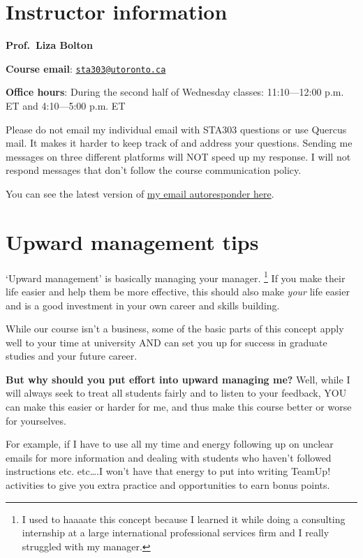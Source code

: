 \documentclass[
  openany]{book}
\begin{document}
\hypertarget{instructor-information}{%
\section{Instructor information}\label{instructor-information}}

\textbf{Prof.~Liza Bolton}

\textbf{Course email}: \href{mailto:sta303@utoronto.ca}{\nolinkurl{sta303@utoronto.ca}}

\textbf{Office hours}: During the second half of Wednesday classes: 11:10---12:00 p.m. ET and 4:10---5:00 p.m. ET

Please do not email my individual email with STA303 questions or use Quercus mail. It makes it harder to keep track of and address your questions. Sending me messages on three different platforms will NOT speed up my response. I will not respond messages that don't follow the course communication policy.

You can see the latest version of \href{https://www.lizabolton.com/autoresponder.html}{my email autoresponder here}.

\hypertarget{upward-management-tips}{%
\section{Upward management tips}\label{upward-management-tips}}

`Upward management' is basically managing your manager. \footnote{I used to haaaate this concept because I learned it while doing a consulting internship at a large international professional services firm and I really struggled with my manager.} If you make their life easier and help them be more effective, this should also make \emph{your} life easier and is a good investment in your own career and skills building.

While our course isn't a business, some of the basic parts of this concept apply well to your time at university AND can set you up for success in graduate studies and your future career.

\textbf{But why should you put effort into upward managing me?} Well, while I will always seek to treat all students fairly and to listen to your feedback, YOU can make this easier or harder for me, and thus make this course better or worse for yourselves.

For example, if I have to use all my time and energy following up on unclear emails for more information and dealing with students who haven't followed instructions etc. etc\ldots.I won't have that energy to put into writing TeamUp! activities to give you extra practice and opportunities to earn bonus points.
\end{document}
